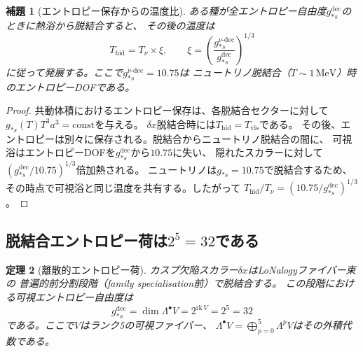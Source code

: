 \documentclass[12pt]{article}
\theoremstyle{plain}
\newtheorem{theorem}{定理}[section]
\newtheorem{lemma}[theorem]{補題}
\theoremstyle{definition}
\numberwithin{equation}{section}
\newcommand{\vis}{\mathrm{vis}}
\newcommand{\hid}{\mathrm{hid}}
\newcommand{\dec}{\mathrm{dec}}
\begin{document}
\begin{lemma}[エントロピー保存からの温度比]\label{lem:xi}
ある種が全エントロピー自由度$g_{*s}^{\dec}$のときに熱浴から脱結合すると、
その後の温度は
\begin{equation}
T_{\hid} = T_\nu\times\xi,
\qquad
\xi = \left(\frac{g_{*s}^{\nu\text{-}\dec}}{g_{*s}^{\dec}}\right)^{1/3}
\end{equation}
に従って発展する。ここで$g_{*s}^{\nu\text{-}\dec}=10.75$は
ニュートリノ脱結合（$T\sim1\,\mathrm{MeV}$）時のエントロピーDOFである。
\end{lemma}

\begin{proof}
共動体積におけるエントロピー保存は、各脱結合セクターに対して
$g_{*s}(T)T^3 a^3=\mathrm{const}$を与える。
$\delta x$脱結合時には$T_{\hid}=T_{\vis}$である。
その後、エントロピーは別々に保存される。脱結合からニュートリノ脱結合の間に、
可視浴はエントロピーDOFを$g_{*s}^{\dec}$から$10.75$に失い、
隠れたスカラーに対して$(g_{*s}^{\dec}/10.75)^{1/3}$倍加熱される。
ニュートリノは$g_{*s}=10.75$で脱結合するため、
その時点で可視浴と同じ温度を共有する。したがって
$T_{\hid}/T_\nu=(10.75/g_{*s}^{\dec})^{1/3}$。
\end{proof}

\subsection{脱結合エントロピー荷は$2^5=32$である}

\begin{theorem}[離散的エントロピー荷]\label{thm:gstar}
カスプ欠陥スカラー$\delta x$はLoNalogyファイバー束の
普遍的前分割段階（family specialisation前）で脱結合する。
この段階における可視エントロピー自由度は
\begin{equation}\label{eq:gstar}
\boxed{g_{*s}^{\dec} = \dim\Lambda^\bullet V = 2^{\mathrm{rk}\,V} = 2^5 = 32}
\end{equation}
である。ここで$V$はランク5の可視ファイバー、
$\Lambda^\bullet V=\bigoplus_{p=0}^{5}\Lambda^p V$はその外積代数である。
\end{theorem}
\end{document}
